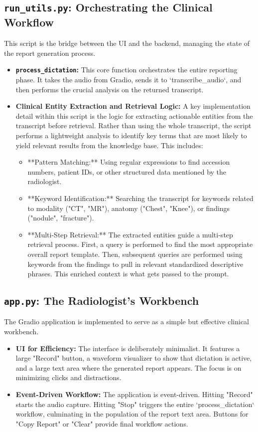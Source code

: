 \subsection{\texttt{run\_utils.py}: Orchestrating the Clinical Workflow}
This script is the bridge between the UI and the backend, managing the state of the report generation process.
\begin{itemize}
    \item \textbf{\texttt{process\_dictation}:} This core function orchestrates the entire reporting phase. It takes the audio from Gradio, sends it to `transcribe\_audio`, and then performs the crucial analysis on the returned transcript.
    \item \textbf{Clinical Entity Extraction and Retrieval Logic:} A key implementation detail within this script is the logic for extracting actionable entities from the transcript before retrieval. Rather than using the whole transcript, the script performs a lightweight analysis to identify key terms that are most likely to yield relevant results from the knowledge base. This includes:
        \begin{itemize}
            \item **Pattern Matching:** Using regular expressions to find accession numbers, patient IDs, or other structured data mentioned by the radiologist.
            \item **Keyword Identification:** Searching the transcript for keywords related to modality ("CT", "MR"), anatomy ("Chest", "Knee"), or findings ("nodule", "fracture").
            \item **Multi-Step Retrieval:** The extracted entities guide a multi-step retrieval process. First, a query is performed to find the most appropriate overall report template. Then, subsequent queries are performed using keywords from the findings to pull in relevant standardized descriptive phrases. This enriched context is what gets passed to the prompt.
        \end{itemize}
\end{itemize}

\subsection{\texttt{app.py}: The Radiologist's Workbench}
The Gradio application is implemented to serve as a simple but effective clinical workbench.
\begin{itemize}
    \item \textbf{UI for Efficiency:} The interface is deliberately minimalist. It features a large "Record" button, a waveform visualizer to show that dictation is active, and a large text area where the generated report appears. The focus is on minimizing clicks and distractions.
    \item \textbf{Event-Driven Workflow:} The application is event-driven. Hitting "Record" starts the audio capture. Hitting "Stop" triggers the entire `process\_dictation` workflow, culminating in the population of the report text area. Buttons for "Copy Report" or "Clear" provide final workflow actions.
\end{itemize}

